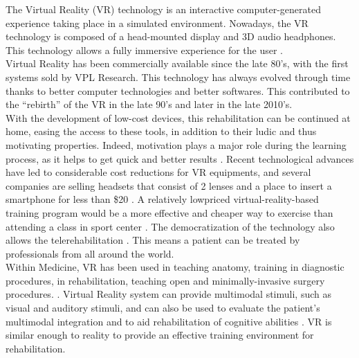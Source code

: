 \documentclass[12pt, openany, twocolumn]{article}
\begin{document}

The Virtual Reality (VR) technology is an interactive computer-generated experience taking place in a simulated environment. 
Nowadays, the VR technology is composed of a head-mounted display and 3D audio headphones.
This technology allows a fully immersive experience for the user \cite{sveistrupMotorRehabilitationUsing2004}.
\\

Virtual Reality has been commercially available since the late 80's, with the first systems sold by VPL Research.
This technology has always evolved through time thanks to better computer technologies and better softwares.
This contributed to the ``rebirth'' of the VR in the late 90's \cite{burdeaVirtualRehabilitationBenefits2003} and later in the late 2010's.
\\

With the development of low-cost devices, this rehabilitation can be continued at home, easing the access to these tools, in addition to their ludic and thus motivating properties.
Indeed, motivation plays a major role during the learning process, as it helps to get quick and better results \cite{kangBenefitRetrievalPractice2014, christophelRelationshipsTeacherImmediacy1990, kinzieRequirementsBenefitsEffective1990b}.
Recent technological advances have led to considerable cost reductions for VR equipments, and several companies are selling headsets that consist of 2 lenses and a place to insert a smartphone for less than \$20 \cite{araneVirtualRealityPain2017}.
A relatively lowpriced virtual-reality-based training program would be a more effective and cheaper way to exercise than attending a class in sport center \cite{kimEffectsVRbasedWii2014}.
The democratization of the technology also allows the telerehabilitation \cite{burdeaVirtualRehabilitationBenefits2003}. This means a patient can be treated by professionals from all around the world. 
\\

Within Medicine, VR has been used in teaching anatomy, training in diagnostic procedures, in rehabilitation, teaching open and minimally-invasive surgery procedures.  \cite{burdeaVirtualRehabilitationBenefits2003}.
Virtual Reality system can provide multimodal stimuli, such as visual and auditory stimuli, and can also be used to evaluate the patient’s multimodal integration and to aid rehabilitation of cognitive abilities \cite{bioulacQuApportentOutils2018, morelAdvantagesLimitationsVirtual2015}. 
VR is similar enough to reality to provide an effective training environment for rehabilitation.
\\
\end{document}
